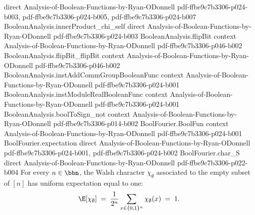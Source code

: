 \begin{lemma}
  {direct}
  {Analysis-of-Boolean-Functions-by-Ryan-ODonnell}
  {pdf-ffbe9c7b3306-p024-b003,
    pdf-ffbe9c7b3306-p024-b005,
    pdf-ffbe9c7b3306-p024-b007}
\proofstep
  {BooleanAnalysis.innerProduct_chi_self}
  {direct}
  {Analysis-of-Boolean-Functions-by-Ryan-ODonnell}
  {pdf-ffbe9c7b3306-p024-b003}
\proofstep
  {BooleanAnalysis.flipBit}
  {context}
  {Analysis-of-Boolean-Functions-by-Ryan-ODonnell}
  {pdf-ffbe9c7b3306-p046-b002}
\proofstep
  {BooleanAnalysis.flipBit_flipBit}
  {context}
  {Analysis-of-Boolean-Functions-by-Ryan-ODonnell}
  {pdf-ffbe9c7b3306-p046-b002}
\proofstep
  {BooleanAnalysis.instAddCommGroupBooleanFunc}
  {context}
  {Analysis-of-Boolean-Functions-by-Ryan-ODonnell}
  {pdf-ffbe9c7b3306-p024-b001}
\proofstep
  {BooleanAnalysis.instModuleRealBooleanFunc}
  {context}
  {Analysis-of-Boolean-Functions-by-Ryan-ODonnell}
  {pdf-ffbe9c7b3306-p024-b001}
\proofstep
  {BooleanAnalysis.boolToSign_not}
  {context}
  {Analysis-of-Boolean-Functions-by-Ryan-ODonnell}
  {pdf-ffbe9c7b3306-p014-b002}
\proofstep
  {BoolFourier.BoolFun}
  {context}
  {Analysis-of-Boolean-Functions-by-Ryan-ODonnell}
  {pdf-ffbe9c7b3306-p024-b001}
\proofstep
  {BoolFourier.expectation}
  {direct}
  {Analysis-of-Boolean-Functions-by-Ryan-ODonnell}
  {pdf-ffbe9c7b3306-p024-b001,
    pdf-ffbe9c7b3306-p024-b002}
\proofstep
  {BoolFourier.char_S}
  {direct}
  {Analysis-of-Boolean-Functions-by-Ryan-ODonnell}
  {pdf-ffbe9c7b3306-p022-b004}
For every $n \in \bbn$, the Walsh character $\chi_\emptyset$ associated to the empty
subset of $[n]$ has uniform expectation equal to one:
\[
\E[\chi_\emptyset] \;=\; \frac{1}{2^n}\sum_{x \in \{0,1\}^n} \chi_\emptyset(x) \;=\; 1.
\]
\end{lemma}

